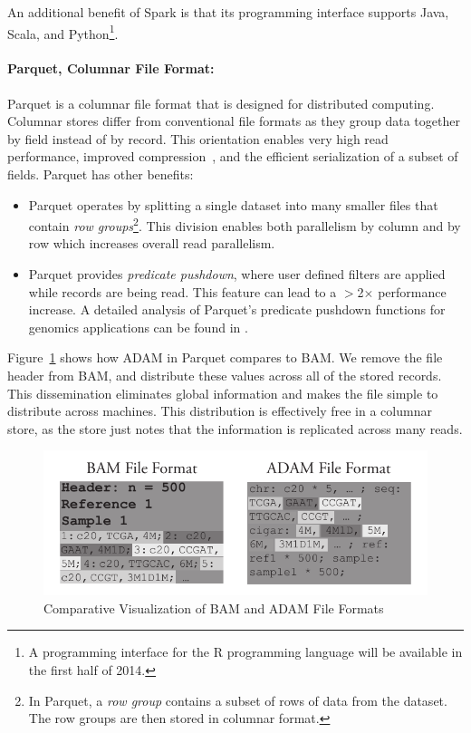 \documentclass{bioinfo}
\begin{document}
An additional benefit of Spark is that its programming interface supports Java, Scala, and Python\footnote{A programming interface for the R programming language will
be available in the first half of 2014.}.

\paragraph{Parquet, Columnar File Format:}
\label{sec:parquet}

Parquet is a columnar file format that is designed for distributed computing. Columnar stores differ from conventional file formats as they group data together
by field instead of by record. This orientation enables very high read performance, improved compression~\citep[see][]{abadi06}, and the efficient serialization of a subset
of fields. Parquet has other benefits:

\begin{itemize}
\item Parquet operates by splitting a single dataset into many smaller files that contain \emph{row groups}\footnote{In Parquet, a \emph{row group} contains a subset
of rows of data from the dataset. The row groups are then stored in columnar format.}. This division enables both parallelism by column and by row which increases overall read
parallelism.
\item Parquet provides \emph{predicate pushdown}, where user defined filters are applied while records are being read. This feature can lead to a $>$2$\times$ performance increase.
A detailed analysis of Parquet's predicate pushdown functions for genomics applications can be found in \citet{massie13}.
\end{itemize}

Figure~\ref{fig:file-format} shows how ADAM in Parquet compares to BAM. We remove the file header from BAM, and distribute these values across all of the stored
records. This dissemination eliminates global information and makes the file simple to distribute across machines. This distribution is effectively free in a columnar store,
as the store just notes that the information is replicated across many reads.

\begin{figure}[h]
\begin{center}
\includegraphics[width=\linewidth]{file-format.pdf}
\end{center}
\caption{Comparative Visualization of BAM and ADAM File Formats}
\label{fig:file-format}
\end{figure}
\end{document}

